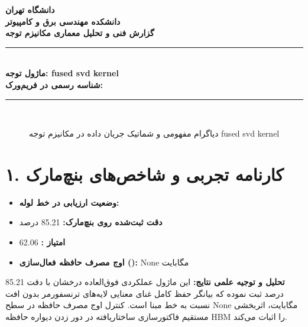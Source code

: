 \documentclass[12pt,a4paper]{article}
\begin{document}
\begin{center}
{\Large\bfseries دانشگاه تهران}\\[0.2cm]
{\large\bfseries دانشکده مهندسی برق و کامپیوتر}\\[0.2cm]
{\large\bfseries گزارش فنی و تحلیل معماری مکانیزم توجه}\\[0.5cm]
\rule{\linewidth}{1pt}\\[0.3cm]
{\LARGE\bfseries ماژول توجه: fused svd kernel}\\[0.2cm]
{\large \textbf{شناسه رسمی در فریم‌ورک:} }\\[0.2cm]
\rule{\linewidth}{1pt}\\[0.5cm]
\end{center}

\begin{figure}[H]
\centering
{}
\caption{دیاگرام مفهومی و شماتیک جریان داده در مکانیزم توجه fused svd kernel}
\end{figure}

\section*{۱. کارنامه تجربی و شاخص‌های بنچ‌مارک}
\begin{itemize}
\item \textbf{وضعیت ارزیابی در خط لوله:} 
\item \textbf{دقت ثبت‌شده روی بنچ‌مارک:} 85.21 درصد
\item \textbf{امتیاز :} 62.06
\item \textbf{اوج مصرف حافظه فعال‌سازی ():} None مگابایت
\end{itemize}
\textbf{تحلیل و توجیه علمی نتایج:} این ماژول عملکردی فوق‌العاده درخشان با دقت 85.21 درصد ثبت نموده که بیانگر حفظ کامل غنای معنایی لایه‌های ترنسفورمر بدون افت نسبت به خط مبنا است. کنترل اوج مصرف حافظه در سطح None مگابایت، اثربخشی مستقیم فاکتورسازی ساختاریافته در دور زدن دیواره حافظه HBM را اثبات می‌کند.
\end{document}
